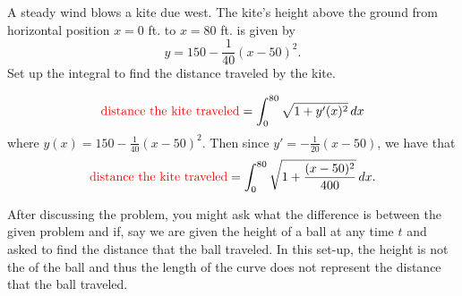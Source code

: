 \documentclass[]{ximera}
\begin{document}
\begin{instructorNotes}

\end{instructorNotes}







\begin{problem}
A steady wind blows a kite due west.  
The kite's height above the ground from horizontal position $x=0$ ft. to $x=80$ ft. is given by
	\[
	y = 150 - \frac{1}{40}(x-50)^2.
	\]
Set up the integral to find the distance traveled by the kite.  
	\begin{freeResponse}
		\[
		\text{{\color{red} distance the kite traveled}} = \int_0^{80} \sqrt{1+y'(x)^2} \,d x
		\]
	where $y(x) = 150 - \frac{1}{40}(x-50)^2$.  
	Then since $y' = - \frac{1}{20}(x-50)$, we have that
		\[
		\text{{\color{red} distance the kite traveled}} = \int_0^{80} \sqrt{1 + \frac{(x-50)^2}{400}} \,d x.
		\]
	\end{freeResponse}
		
\end{problem}

\begin{instructorNotes}
After discussing the problem, you might ask what the difference is between the given problem and if, say we are given the height of a ball at any time $t$ and asked to find the distance that the ball traveled.  
In this set-up, the height is not the  of the ball and thus the length of the curve does not represent the distance that the ball traveled.  
\end{instructorNotes}
\end{document}
